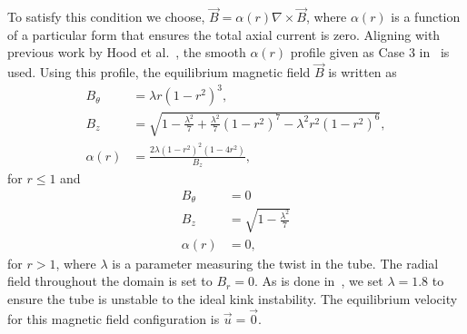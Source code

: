 To satisfy this condition we choose,  $\vec{B} = \alpha(r) \nabla \times \vec{B}$, where
$\alpha(r)$ is a function of a particular form that ensures the total
axial current is zero. Aligning with previous work by Hood et
al.~\cite{hoodCoronalHeatingMagnetic2009}, the smooth $\alpha(r)$
profile given as Case 3 in~\cite{hoodCoronalHeatingMagnetic2009} is
used. Using this profile, the equilibrium magnetic field $\vec{B}$ is
written  as
\begin{equation}
\begin{aligned}
  \label{eq:field-profile-r-lt-1}
  B_{\theta} &= \lambda r {(1 - r^2)}^3,\\
  B_z &= \sqrt{1 - \frac{\lambda^2}{7} + \frac{\lambda^2}{7}{(1 - r^2)}^7 - \lambda^2 r^2 {(1-r^2)}^6},\\
  \alpha(r) &= \frac{2 \lambda {(1-r^2)}^2 {(1-4r^2)}}{B_z},
\end{aligned}
\end{equation}
for $r \leq 1$ and
\begin{equation}
\begin{aligned}
  \label{eq:field-profile-r-gt-1}
  B_{\theta} &= 0 \\
  B_z &= \sqrt{1 - \frac{\lambda^2}{7}}\\
  \alpha(r) &= 0 ,
\end{aligned}
\end{equation}
for $r > 1$, where $\lambda$ is a parameter measuring the twist in the tube. The radial field throughout the domain is set to $B_r = 0$. As is done in~\cite{hoodCoronalHeatingMagnetic2009}, we set $\lambda = 1.8$ to ensure the tube is unstable to the ideal kink instability. The equilibrium velocity for this magnetic field configuration is $\vec{u} = \vec{0}$.


